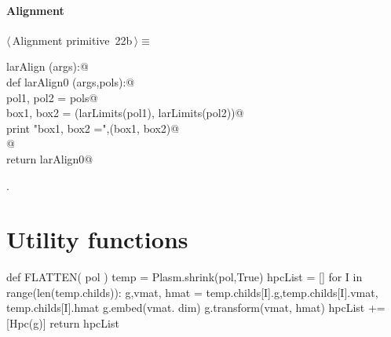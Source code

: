 \documentclass[11pt,oneside]{article}	%
\begin{document}
\paragraph{Alignment}
\begin{flushleft} \small \label{scrap42}
\protect{}$\langle\,$Alignment primitive\nobreak\ {\footnotesize 22b}$\,\rangle\equiv$
\vspace{-1ex}
\begin{list}{}{} \item
\mbox{}\verb@def larAlign (args):@\\
\mbox{}\verb@   def larAlign0 (args,pols):@\\
\mbox{}\verb@      pol1, pol2 = pols@\\
\mbox{}\verb@      box1, box2 = (larLimits(pol1), larLimits(pol2))@\\
\mbox{}\verb@      print "box1, box2 =",(box1, box2)@\\
\mbox{}\verb@      @\\
\mbox{}\verb@   return larAlign0@\\
\mbox{}\verb@@{\NWsep}
\end{list}
\vspace{-1ex}
\footnotesize\addtolength{\baselineskip}{-1ex}
\begin{list}{}{\setlength{\itemsep}{-\parsep}\setlength{\itemindent}{-\leftmargin}}
\item {\NWtxtMacroNoRef}.
\end{list}
\end{flushleft}

\appendix
\section{Utility functions}



def FLATTEN( pol )
	temp = Plasm.shrink(pol,True)
	hpcList = []
	for I in range(len(temp.childs)):			
		g,vmat, hmat = temp.childs[I].g,temp.childs[I].vmat, temp.childs[I].hmat
		g.embed(vmat. dim)
		g.transform(vmat, hmat)
		hpcList += [Hpc(g)]
	return hpcList
	
\end{document}
